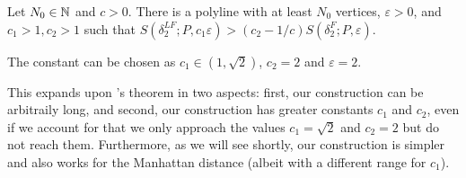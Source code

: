 \begin{theorem}\label{thm:lg-approx}
	Let \(N_0 \in \mathbb{N}\) and \(c > 0\). There is a polyline with at least \(N_0\) vertices, \(\varepsilon >0\), and \(c_1 > 1, c_2 > 1\) such that \(S(\delta^{LF}_2; P, c_1 \varepsilon) > (c_2 - 1/c)S(\delta^F_2; P, \varepsilon)\).

	The constant can be chosen as \(c_1 \in (1, \sqrt{2})\), \(c_2 = 2\) and \(\varepsilon = 2\).
\end{theorem}

This expands upon \citeauthor{on_optimal_polyline_simplification_using_the_hausdorff_and_frechet_distance}'s theorem in two aspects: first, our construction can be arbitraily long, and second, our construction has greater constants \(c_1\) and \(c_2\), even if we account for that we only approach the values \(c_1 = \sqrt{2}\) and \(c_2 = 2\) but do not reach them. Furthermore, as we will see shortly, our construction is simpler and also works for the Manhattan distance (albeit with a different range for \(c_1\)).

